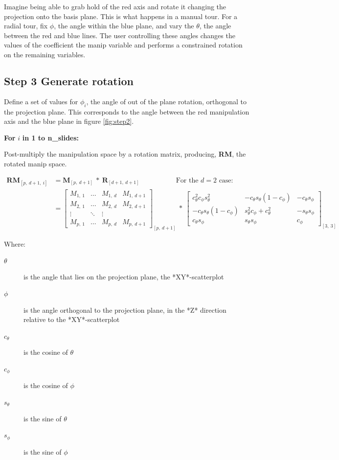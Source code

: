 \documentclass{monashthesis}
\begin{document}
Imagine being able to grab hold of the red axis and rotate it changing
the projection onto the basis plane. This is what happens in a manual
tour. For a radial tour, fix \(\phi\), the angle within the blue plane,
and vary the \(\theta\), the angle between the red and blue lines. The
user controlling these angles changes the values of the coefficient the
manip variable and performs a constrained rotation on the remaining
variables.

\subsection{Step 3 Generate rotation}\label{step-3-generate-rotation-1}

Define a set of values for \(\phi_i\), the angle of out of the plane
rotation, orthogonal to the projection plane. This corresponds to the
angle between the red manipulation axis and the blue plane in figure
\ref{fig:step2}.

\textbf{For } \(i\) \textbf{in 1 to n\_slides:}

Post-multiply the manipulation space by a rotation matrix, producing,
\textbf{RM}, the rotated manip space.

\begin{align*}
  \textbf{RM}_{[p,~d+1,~i]}
  &= \textbf{M}_{[p,~d+1]} ~*~ \textbf{R}_{[d+1,~d+1]}
    ~~~~~~~~~~~~~~~~~~~~~~~~\text{For the $d=2$ case:} \\
  &= \begin{bmatrix}
    M_{1,~1} & \dots & M_{1,~d} & M_{1,~d+1} \\
    M_{2,~1} & \dots & M_{2,~d} & M_{2,~d+1} \\
    \vdots   & \ddots& \vdots   \\
    M_{p,~1} & \dots & M_{p,~d} & M_{p,~d+1}
  \end{bmatrix}_{[p,~d+1]}
    ~*~
  \begin{bmatrix}
    c_\theta^2 c_\phi s_\theta^2 &
    -c_\theta s_\theta (1 - c_\phi) &
    -c_\theta s_\phi \\
    -c_\theta s_\theta (1 - c_\phi) &
    s_\theta^2 c_\phi + c_\theta^2 &
    -s_\theta s_\phi \\
    c_\theta s_\phi &
    s_\theta s_\phi &
    c_\phi
  \end{bmatrix}_{[3,~3]}
\end{align*}

Where:

\begin{description}
  \item[$\theta$] is the angle that lies on the projection plane, the *XY*-scatterplot
  \item[$\phi$] is the angle orthogonal to the projection plane, in the *Z* direction relative to the *XY*-scatterplot
  \item[$c_\theta$] is the cosine of $\theta$
  \item[$c_\phi$]   is the cosine of $\phi$
  \item[$s_\theta$] is the sine of   $\theta$
  \item[$s_\phi$]   is the sine of   $\phi$
\end{description}
\end{document}
